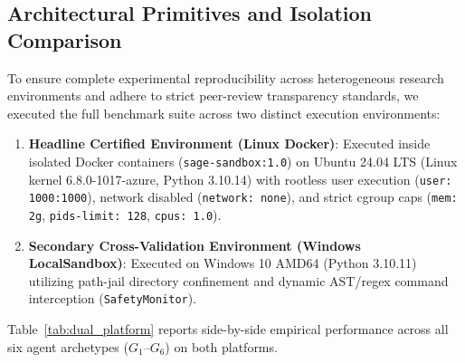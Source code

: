 \documentclass{article}
\begin{document}
\subsection{Architectural Primitives and Isolation Comparison}
To ensure complete experimental reproducibility across heterogeneous research environments and adhere to strict peer-review transparency standards, we executed the full benchmark suite across two distinct execution environments:
\begin{enumerate}
    \item \textbf{Headline Certified Environment (Linux Docker)}: Executed inside isolated Docker containers (\texttt{sage-sandbox:1.0}) on Ubuntu 24.04 LTS (Linux kernel 6.8.0-1017-azure, Python 3.10.14) with rootless user execution (\texttt{user: 1000:1000}), network disabled (\texttt{network: none}), and strict cgroup caps (\texttt{mem: 2g}, \texttt{pids-limit: 128}, \texttt{cpus: 1.0}).
    \item \textbf{Secondary Cross-Validation Environment (Windows LocalSandbox)}: Executed on Windows 10 AMD64 (Python 3.10.11) utilizing path-jail directory confinement and dynamic AST/regex command interception (\texttt{SafetyMonitor}).
\end{enumerate}

Table~\ref{tab:dual_platform} reports side-by-side empirical performance across all six agent archetypes ($G_1$--$G_6$) on both platforms.


\end{document}
